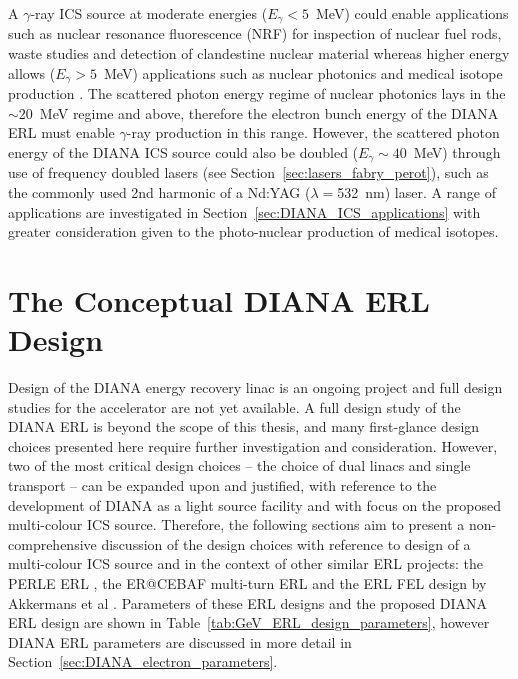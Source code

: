 \documentclass[../main.tex]{subfiles}
\begin{document}
A $\gamma$-ray ICS source at moderate energies ($E_{\gamma} < 5$~\si{\mega\electronvolt}) could enable applications such as nuclear resonance fluorescence (NRF) for inspection of nuclear fuel rods, waste studies and detection of clandestine nuclear material \cite{angell2015demonstration,bolind2015states} whereas higher energy allows ($E_{\gamma} > 5$~\si{\mega\electronvolt}) applications such as nuclear photonics \cite{budker2021expanding} and medical isotope production \cite{habs2011production}. The scattered photon energy regime of nuclear photonics lays in the $\sim$20~\si{\mega\electronvolt} regime and above, therefore the electron bunch energy of the DIANA ERL must enable $\gamma$-ray production in this range. However, the scattered photon energy of the DIANA ICS source could also be doubled ($E_{\gamma}\sim 40$~\si{\mega\electronvolt}) through use of frequency doubled lasers (see Section~\ref{sec:lasers_fabry_perot}), such as the commonly used 2nd harmonic of a Nd:YAG ($\lambda =$532~\si{\nano\meter}) laser. A range of applications are investigated in Section~\ref{sec:DIANA_ICS_applications} with greater consideration given to the photo-nuclear production of medical isotopes. 

\section{The Conceptual DIANA ERL Design}
\label{sec:DIANA_ERL_design}

Design of the DIANA energy recovery linac is an ongoing project and full design studies for the accelerator are not yet available. A full design study of the DIANA ERL is beyond the scope of this thesis, and many first-glance design choices presented here require further investigation and consideration. However, two of the most critical design choices -- the choice of dual linacs and single transport -- can be expanded upon and justified, with reference to the development of DIANA as a light source facility and with focus on the proposed multi-colour ICS source. Therefore, the  following sections aim to present a non-comprehensive discussion of the design choices with reference to design of a multi-colour ICS source and in the context of other similar ERL projects: the PERLE ERL \cite{angal2018perle}, the ER@CEBAF multi-turn ERL \cite{meot2016er} and the ERL FEL design by Akkermans et al \cite{akkermans2017compact}. Parameters of these ERL designs and the proposed DIANA ERL design are shown in Table~\ref{tab:GeV_ERL_design_parameters}, however DIANA ERL parameters are discussed in more detail in Section~\ref{sec:DIANA_electron_parameters}. 
\end{document}
